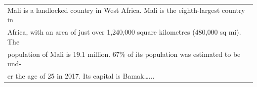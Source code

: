 \begin{table}[th]
\scriptsize
\begin{tabular}{|l|}
\hline
\raggedright
Mali is a landlocked country in West Africa. Mali is the eighth-largest country in\\ Africa, with an area of just over 1,240,000 square kilometres (480,000 sq mi). The\\ population of Mali is 19.1 million. 67\% of its population was estimated to be und-\\er the age of 25 in 2017. Its capital is Bamak…...\\

\end{tabular}
\end{table}
